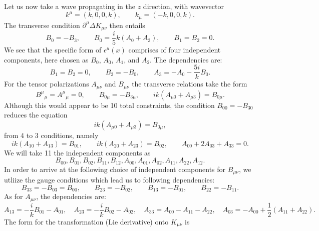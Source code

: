 \documentclass[10pt,letterpaper]{article}
\begin{document}
Let us now take a wave propagating in the $z$ direction, with wavevector
\begin{equation}
k^\mu = (k,0,0,k),\qquad k_\mu = (-k,0,0,k).
\end{equation}
The transverse condition $\partial^\mu \Delta K_{\mu\nu}$ then entails
\begin{equation}
B_0 = -B_3,\qquad B_0 = \frac{i}{5}k(A_0+A_3),\qquad B_1 = B_2 = 0.
\end{equation}
We see that the specific form of $\epsilon^\mu(x)$ comprises of four independent components, here chosen as $B_0$, $A_0$, $A_1$, and $A_2$. The dependencies are:
\begin{equation}
B_{1} = B_{2} = 0,\qquad B_3 = -B_0,\qquad A_3 = -A_0 - \frac{5i}{k} B_0.
\end{equation}
For the tensor polarizations $A_{\mu\nu}$ and $B_{\mu\nu}$ the transverse relations take the form
\begin{equation}
B^\mu{}_\mu = A^\mu{}_\mu = 0,\qquad B_{0\mu} = -B_{3\mu},\qquad ik(A_{\mu 0}+ A_{\mu 3}) = B_{0\mu}.
\end{equation}
Although this would appear to be 10 total constraints, the condition $B_{00} = -B_{30}$ reduces the equation
\begin{equation}
ik(A_{\mu0}+A_{\mu 3}) = B_{0\mu},
\end{equation}
from 4 to 3 conditions, namely
\begin{equation}
ik(A_{10}+A_{13}) = B_{01},\qquad ik(A_{20}+A_{23}) = B_{02},\qquad A_{00} + 2A_{03} + A_{33} = 0.
\end{equation}
 We will take 11 the independent components as 
\begin{equation}
B_{00}, B_{01},B_{02},B_{11}, B_{12}, A_{00},A_{01},A_{02},A_{11},A_{22},A_{12}.
\end{equation}
In order to arrive at the following choice of independent components for $B_{\mu\nu}$, we utliize the gauge conditions which lead us to following dependencies:
\begin{equation}
B_{33} = -B_{03} = B_{00},\qquad B_{23} = -B_{02},\qquad B_{13} = -B_{01},\qquad B_{22} = -B_{11}.
\end{equation}
As for $A_{\mu\nu}$, the dependencies are:
\begin{equation}
A_{13} = -\frac{i}{k} B_{01} - A_{01},\quad
A_{23} = -\frac{i}{k}B_{02} - A_{02},\quad
A_{33} = A_{00} - A_{11} - A_{22},\quad
A_{03} = -A_{00} + \frac12 (A_{11}+A_{22}).
\end{equation}
The form for the transformation (Lie derivative) onto $K_{\mu\nu}$ is
\end{document}
